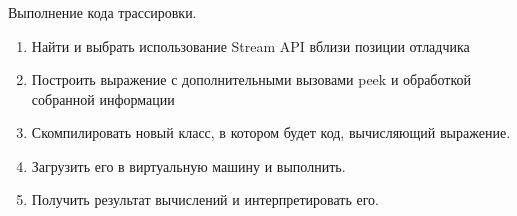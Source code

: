 \begin{frame}
\frametitle{\insertsection} 
\framesubtitle{\insertsubsection}
Выполнение кода трассировки.
\begin{enumerate}
	\item Найти и выбрать использование Stream API вблизи позиции отладчика
	\item Построить выражение с дополнительными вызовами peek и обработкой собранной информации
	\item Скомпилировать новый класс, в котором будет код, вычисляющий выражение.
	\item Загрузить его в виртуальную машину и выполнить.
	\item Получить результат вычислений и интерпретировать его.
\end{enumerate}
\end{frame}

